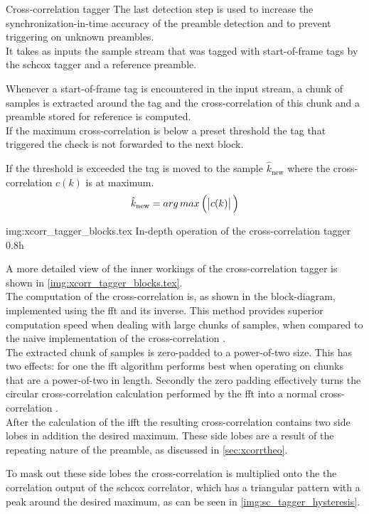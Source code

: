 \begin{subchapter}{Cross-correlation tagger}
  The last detection step is used to increase the synchronization-in-time
  accuracy of the preamble detection and to prevent triggering on unknown
  preambles. \\

  It takes as inputs the sample stream that was tagged with
  start-of-frame tags by the \acrshort{schcox} tagger
  and a reference preamble.

  Whenever a start-of-frame tag is encountered in the input stream,
  a chunk of samples is extracted around the tag and the
  cross-correlation of this chunk and a preamble stored for reference
  is computed. \\

  If the maximum cross-correlation is below a preset threshold
  the tag that triggered the check is not forwarded to the
  next block.

  If the threshold is exceeded the tag is moved to the sample $\hat{k}_\text{new}$
  where the cross-correlation $c(k)$ is at maximum. \\

  \begin{equation*}
    \hat{k}_\text{new}= arg\,max\left( \, \abs{c(k)} \, \right)
  \end{equation*}

               {img:xcorr_tagger_blocks.tex}
               {In-depth operation of the cross-correlation tagger}
               {0.8}{h}

  A more detailed view of the inner workings of the cross-correlation
  tagger is shown in \autoref{img:xcorr_tagger_blocks.tex}. \\

  The computation of the cross-correlation is, as shown in the
  block-diagram, implemented using the \acrlong{fft} and its inverse.
  This method provides superior computation speed when dealing
  with large chunks of samples, when compared to the naive implementation
  of the cross-correlation \cite{kammeyer2012}. \\

  The extracted chunk of samples is zero-padded to a power-of-two size.
  This has two effects: for one the \acrshort{fft} algorithm performs
  best when operating on chunks that are a power-of-two in length.
  Secondly the zero padding effectively turns the circular cross-correlation
  calculation performed by the \acrshort{fft} into a normal cross-correlation
  \cite{kammeyer2012}. \\

  After the calculation of the \acrshort{ifft} the resulting cross-correlation
  contains two side lobes in addition the desired maximum.
  These side lobes are a result of the repeating nature of the preamble, as
  discussed in \autoref{sec:xcorrtheo}.

  To mask out these side lobes the cross-correlation is multiplied onto
  the the correlation output of the \acrlong{schcox} correlator,
  which has a triangular pattern with a peak around the desired
  maximum, as can be seen in \autoref{img:sc_tagger_hysteresis}.
\end{subchapter}
